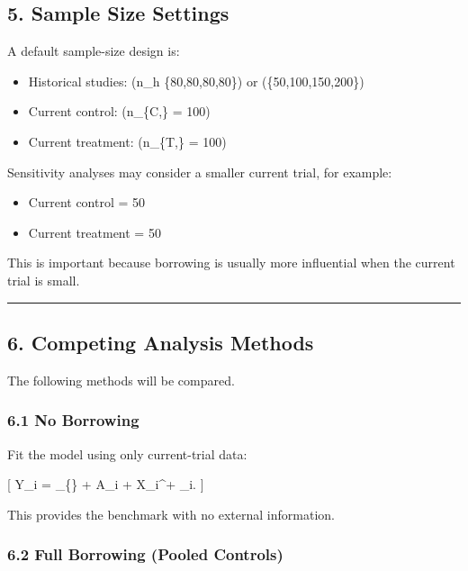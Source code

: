 \documentclass[
  letterpaper,
  DIV=11,
  numbers=noendperiod]{scrartcl}
\providecommand{\tightlist}{%
  \setlength{\itemsep}{0pt}\setlength{\parskip}{0pt}}
\begin{document}
\subsection{5. Sample Size Settings}\label{sample-size-settings}

A default sample-size design is:

\begin{itemize}
\tightlist
\item
  Historical studies: (n\_h \in \{80,80,80,80\}) or (\{50,100,150,200\})
\item
  Current control: (n\_\{C,\} = 100)
\item
  Current treatment: (n\_\{T,\} = 100)
\end{itemize}

Sensitivity analyses may consider a smaller current trial, for example:

\begin{itemize}
\tightlist
\item
  Current control = 50
\item
  Current treatment = 50
\end{itemize}

This is important because borrowing is usually more influential when the
current trial is small.

\begin{center}\rule{0.5\linewidth}{0.5pt}\end{center}

\subsection{6. Competing Analysis
Methods}\label{competing-analysis-methods}

The following methods will be compared.

\subsubsection{6.1 No Borrowing}\label{no-borrowing}

Fit the model using only current-trial data:

{[} Y\_i = \alpha\_\{\} + \tau A\_i + X\_i\^{}\top \beta +
\varepsilon\_i. {]}

This provides the benchmark with no external information.

\subsubsection{6.2 Full Borrowing (Pooled
Controls)}\label{full-borrowing-pooled-controls}
\end{document}
